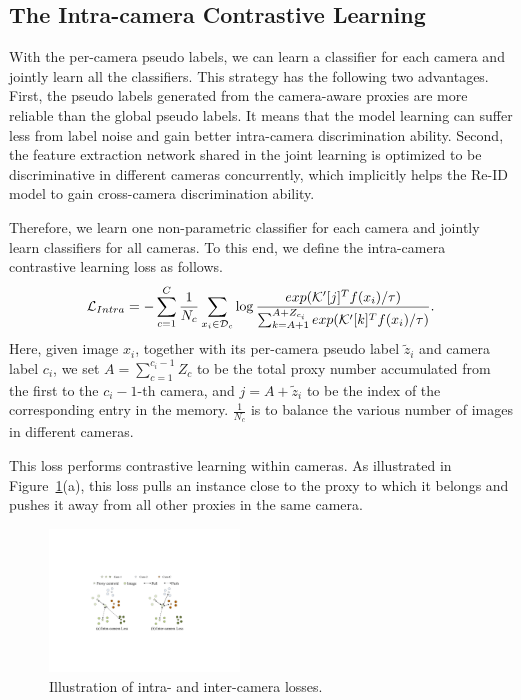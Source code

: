 \documentclass[letterpaper]{article} %
\begin{document}
\subsection{The Intra-camera Contrastive Learning}
With the per-camera pseudo labels, we can learn a classifier for each camera and jointly learn all the classifiers. This strategy has the following two advantages. First, the pseudo labels generated from the camera-aware proxies are more reliable than the global pseudo labels. It means that the model learning can suffer less from label noise and gain better intra-camera discrimination ability. Second, the feature extraction network shared in the joint learning is optimized to be discriminative in different cameras concurrently, which implicitly helps the Re-ID model to gain cross-camera discrimination ability. 

Therefore, we learn one non-parametric classifier for each camera and jointly learn classifiers for all cameras. To this end, we define the intra-camera contrastive learning loss as follows.
\begin{equation}
\small
\mathcal{L}_{Intra} = -\sum_{c=1}^{C}\frac{1}{N_c}\sum_{x_i\in \mathcal{D}_c} \log \frac{exp(\mathcal{K}'[j]^T f(x_i)/\tau)}{\sum _{k=A+1}^{A+Z_{c_i}} exp(\mathcal{K}'[k]^T f(x_i)/\tau)}.
\label{eq_intra_loss}
\end{equation}
Here, given image $x_i$, together with its per-camera pseudo label $\tilde{z}_i$ and camera label $c_i$, we set $A = \sum_{c=1}^{c_i-1} Z_c$ to be the total proxy number accumulated from the first to the $c_i-1$-th camera, and $j= A + \tilde{z}_i$ to be the index of the corresponding entry in the memory. $\frac{1}{N_c}$ is to balance the various number of images in different cameras. 

This loss performs contrastive learning within cameras. As illustrated in Figure~\ref{fig_loss}(a), this loss pulls an instance close to the proxy to which it belongs and pushes it away from all other proxies in the same camera. %


\begin{figure}[t]
\centering
\includegraphics[width=0.45\textwidth]{./loss_illustration}
\caption{Illustration of intra- and inter-camera losses.}
\label{fig_loss}
\end{figure}
\end{document}
